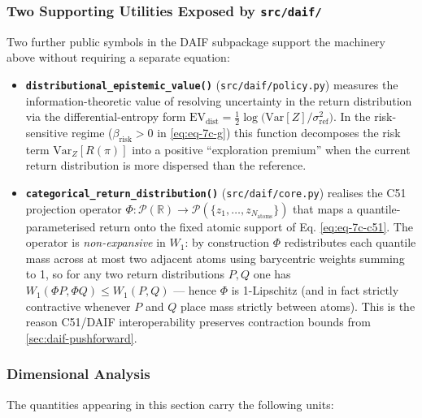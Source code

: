 \documentclass[
]{article}
\providecommand{\tightlist}{%
  \setlength{\itemsep}{0pt}\setlength{\parskip}{0pt}}
\begin{document}
\subsubsection{\texorpdfstring{Two Supporting Utilities Exposed by
\texttt{src/daif/}}{Two Supporting Utilities Exposed by src/daif/}}\label{sec:daif-support-utils}

Two further public symbols in the DAIF subpackage support the machinery
above without requiring a separate equation:

\begin{itemize}
\tightlist
\item
  \textbf{\texttt{distributional\_epistemic\_value()}}
  (\texttt{src/daif/policy.py}) measures the information-theoretic value
  of resolving uncertainty in the return distribution via the
  differential-entropy form
  \(\mathrm{EV}_{\mathrm{dist}} = \tfrac{1}{2}\log\bigl(\mathrm{Var}[Z]/\sigma^2_{\mathrm{ref}}\bigr)\).
  In the risk-sensitive regime (\(\beta_{\mathrm{risk}}>0\) in
  \autoref{eq:eq-7c-g}) this function decomposes the risk term
  \(\mathrm{Var}_Z[R(\pi)]\) into a positive ``exploration premium''
  when the current return distribution is more dispersed than the
  reference.
\item
  \textbf{\texttt{categorical\_return\_distribution()}}
  (\texttt{src/daif/core.py}) realises the C51 projection operator
  \(\Phi\colon \mathcal{P}(\mathbb{R}) \to \mathcal{P}(\{z_1,\dots,z_{N_{\text{atoms}}}\})\)
  that maps a quantile-parameterised return onto the fixed atomic
  support of Eq. \ref{eq:eq-7c-c51}. The operator is
  \emph{non-expansive} in \(W_1\): by construction \(\Phi\)
  redistributes each quantile mass across at most two adjacent atoms
  using barycentric weights summing to 1, so for any two return
  distributions \(P, Q\) one has \(W_1(\Phi P, \Phi Q) \le W_1(P, Q)\)
  --- hence \(\Phi\) is 1-Lipschitz (and in fact strictly contractive
  whenever \(P\) and \(Q\) place mass strictly between atoms). This is
  the reason C51/DAIF interoperability preserves contraction bounds from
  \autoref{sec:daif-pushforward}.
\end{itemize}

\subsubsection{Dimensional Analysis}\label{dimensional-analysis}

The quantities appearing in this section carry the following units:
\end{document}
